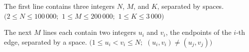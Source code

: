 The first line contains three integers $N$, $M$, and $K$, separated by spaces. $(2 \le N \le 100\, 000;$ $1 \le M \le 200\, 000;$ $1 \le K \le 3\, 000)$

The next $M$ lines each contain two integers $u_i$ and $v_i$, the endpoints of the $i$-th edge, separated by a space. $(1 \le u_i \lt v_i \le N;$ $(u_i, v_i) \ne (u_j, v_j) )$